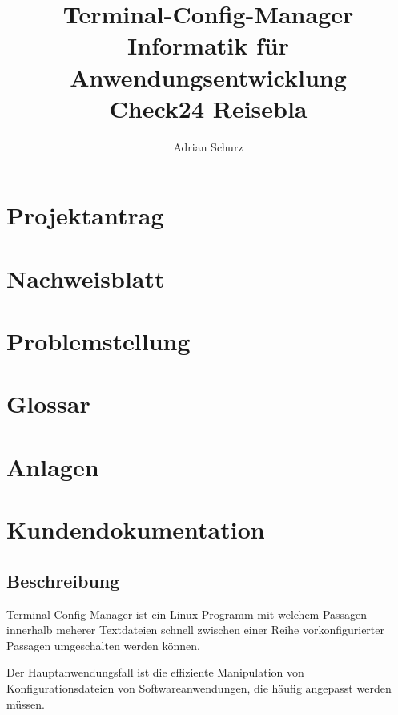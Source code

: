 \documentclass[a4paper,11pt]{scrartcl} %
\author{Adrian Schurz}
\title{Terminal-Config-Manager\\
	Informatik für Anwendungsentwicklung\\
	Check24 Reisebla\\ %
	}
\begin{document}

\maketitle
{}
\newpage

\section{Projektantrag}
\paragraph{}

\section{Nachweisblatt}
\paragraph{}

\newpage
\tableofcontents
\newpage


\section{Problemstellung}
\paragraph{}


\section{Glossar}


\section{Anlagen}

\section{Kundendokumentation}

\subsection{Beschreibung}
Terminal-Config-Manager ist ein Linux-Programm mit welchem
Passagen innerhalb meherer Textdateien schnell zwischen einer Reihe
vorkonfigurierter Passagen umgeschalten werden können.

Der Hauptanwendungsfall ist die effiziente  Manipulation von
Konfigurationsdateien von Softwareanwendungen, die häufig angepasst
werden müssen.








\end{document}

